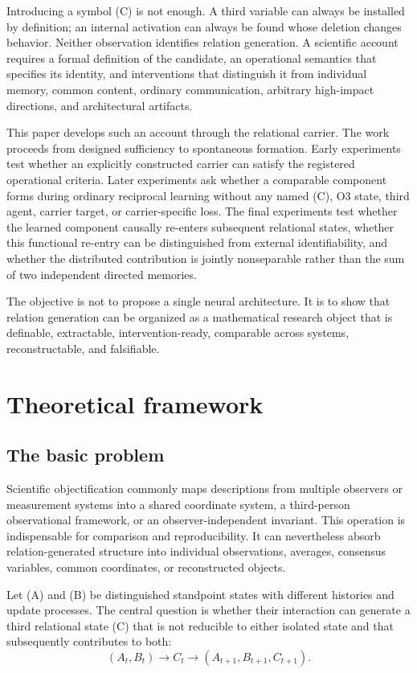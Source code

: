 \documentclass[11pt,a4paper]{article}
\begin{document}
Introducing a symbol (C) is not enough. A third variable can always be installed by definition; an internal activation can always be found whose deletion changes behavior. Neither observation identifies relation generation. A scientific account requires a formal definition of the candidate, an operational semantics that specifies its identity, and interventions that distinguish it from individual memory, common content, ordinary communication, arbitrary high-impact directions, and architectural artifacts.

This paper develops such an account through the relational carrier. The work proceeds from designed sufficiency to spontaneous formation. Early experiments test whether an explicitly constructed carrier can satisfy the registered operational criteria. Later experiments ask whether a comparable component forms during ordinary reciprocal learning without any named (C), O3 state, third agent, carrier target, or carrier-specific loss. The final experiments test whether the learned component causally re-enters subsequent relational states, whether this functional re-entry can be distinguished from external identifiability, and whether the distributed contribution is jointly nonseparable rather than the sum of two independent directed memories.

The objective is not to propose a single neural architecture. It is to show that relation generation can be organized as a mathematical research object that is definable, extractable, intervention-ready, comparable across systems, reconstructable, and falsifiable.

\section{Theoretical framework}

\subsection{The basic problem}

Scientific objectification commonly maps descriptions from multiple observers or measurement systems into a shared coordinate system, a third-person observational framework, or an observer-independent invariant. This operation is indispensable for comparison and reproducibility. It can nevertheless absorb relation-generated structure into individual observations, averages, consensus variables, common coordinates, or reconstructed objects.

Let (A) and (B) be distinguished standpoint states with different histories and update processes. The central question is whether their interaction can generate a third relational state (C) that is not reducible to either isolated state and that subsequently contributes to both:
\begin{equation}
  (A_t,B_t) \longrightarrow C_t
  \longrightarrow (A_{t+1},B_{t+1},C_{t+1}).
  \label{eq:closure}
\end{equation}
\end{document}
